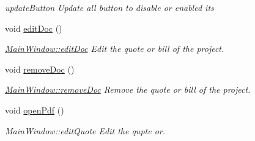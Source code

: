 \begin{DoxyCompactItemize}
\begin{DoxyCompactList}\small\item\em update\-Button Update all button to disable or enabled its \end{DoxyCompactList}\item 
\hypertarget{classGui_1_1MainWindow_a06bc679c41574cb679c6e5e7b673139c}{void \hyperlink{classGui_1_1MainWindow_a06bc679c41574cb679c6e5e7b673139c}{edit\-Doc} ()}\label{classGui_1_1MainWindow_a06bc679c41574cb679c6e5e7b673139c}

\begin{DoxyCompactList}\small\item\em \hyperlink{classGui_1_1MainWindow_a06bc679c41574cb679c6e5e7b673139c}{Main\-Window\-::edit\-Doc} Edit the quote or bill of the project. \end{DoxyCompactList}\item 
\hypertarget{classGui_1_1MainWindow_af86458ad953cb70fb7a88245a6047550}{void \hyperlink{classGui_1_1MainWindow_af86458ad953cb70fb7a88245a6047550}{remove\-Doc} ()}\label{classGui_1_1MainWindow_af86458ad953cb70fb7a88245a6047550}

\begin{DoxyCompactList}\small\item\em \hyperlink{classGui_1_1MainWindow_af86458ad953cb70fb7a88245a6047550}{Main\-Window\-::remove\-Doc} Remove the quote or bill of the project. \end{DoxyCompactList}\item 
\hypertarget{classGui_1_1MainWindow_a6fc6c0f088d3996ad941705a13d7aaae}{void \hyperlink{classGui_1_1MainWindow_a6fc6c0f088d3996ad941705a13d7aaae}{open\-Pdf} ()}\label{classGui_1_1MainWindow_a6fc6c0f088d3996ad941705a13d7aaae}

\begin{DoxyCompactList}\small\item\em Main\-Window\-::edit\-Quote Edit the qupte or. \end{DoxyCompactList}\end{DoxyCompactItemize}
